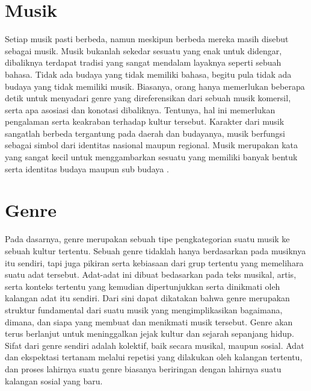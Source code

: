 \section{Musik}
\label{sec:musik}
Setiap musik pasti berbeda, namun meskipun berbeda mereka masih disebut sebagai musik. Musik bukanlah sekedar sesuatu yang enak untuk didengar, dibaliknya terdapat tradisi yang sangat mendalam layaknya seperti sebuah bahasa. Tidak ada budaya yang tidak memiliki bahasa, begitu pula tidak ada budaya yang tidak memiliki musik. Biasanya, orang hanya memerlukan beberapa detik untuk menyadari genre yang direferensikan dari sebuah musik komersil, serta apa asosiasi dan konotasi dibaliknya. Tentunya, hal ini memerlukan pengalaman serta keakraban terhadap kultur tersebut. Karakter dari musik sangatlah berbeda tergantung pada daerah dan budayanya, musik berfungsi sebagai simbol dari identitas nasional maupun regional. Musik merupakan kata yang sangat kecil untuk menggambarkan sesuatu yang memiliki banyak bentuk serta identitas budaya maupun sub budaya \citep{cook1998music}.

\section{Genre}
\label{sec:genre}
Pada dasarnya, genre merupakan sebuah tipe pengkategorian suatu musik ke sebuah kultur tertentu. Sebuah genre tidaklah hanya berdasarkan pada musiknya itu sendiri, tapi juga pikiran serta kebiasaan dari grup tertentu yang memelihara suatu adat tersebut. Adat-adat ini dibuat bedasarkan pada teks musikal, artis, serta konteks tertentu yang kemudian dipertunjukkan serta dinikmati oleh kalangan adat itu sendiri. Dari sini dapat dikatakan bahwa genre merupakan struktur fundamental dari suatu musik yang mengimplikasikan bagaimana, dimana, dan siapa yang membuat dan menikmati musik tersebut. Genre akan terus berlanjut untuk meninggalkan jejak kultur dan sejarah sepanjang hidup. Sifat dari genre sendiri adalah kolektif, baik secara musikal, maupun sosial. Adat dan ekspektasi tertanam melalui repetisi yang dilakukan oleh kalangan tertentu, dan proses lahirnya suatu genre biasanya beriringan dengan lahirnya suatu kalangan sosial yang baru\citep{holt2007genre}.

